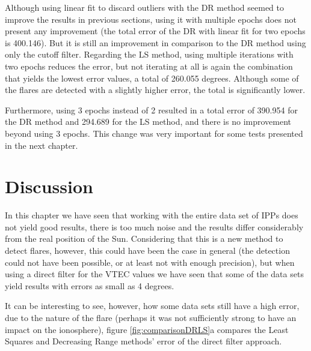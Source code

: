 Although using linear fit to discard outliers with the DR method seemed to improve the results in previous sections, using it with multiple epochs does not present any improvement (the total error of the DR with linear fit for two epochs is 400.146). But it is still an improvement in comparison to the DR method using only the cutoff filter. Regarding the LS method, using multiple iterations with two epochs reduces the error, but not iterating at all is again the combination that yields the lowest error values, a total of 260.055 degrees. Although some of the flares are detected with a slightly higher error, the total is significantly lower.

Furthermore, using 3 epochs instead of 2 resulted in a total error of 390.954 for the DR method and 294.689 for the LS method, and there is no improvement beyond using 3 epochs. This change was very important for some tests presented in the next chapter.

\clearpage

\section{Discussion}

In this chapter we have seen that working with the entire data set of IPPs does not yield good results, there is too much noise and the results differ considerably from the real position of the Sun. Considering that this is a new method to detect flares, however, this could have been the case in general (the detection could not have been possible, or at least not with enough precision), but when using a direct filter for the VTEC values we have seen that some of the data sets yield results with errors as small as 4 degrees.

It can be interesting to see, however, how some data sets still have a high error, due to the nature of the flare (perhaps it was not sufficiently strong to have an impact on the ionosphere), figure \ref{fig:comparisonDRLS}a compares the Least Squares and Decreasing Range methods' error of the direct filter approach.

